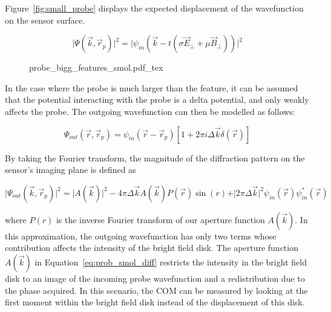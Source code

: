 Figure~\ref{fig:small_probe} displays the expected displacement of the wavefunction on the sensor surface.

\begin{equation}
    \vert \Psi(\vec{k},\vec{r}_p)\vert^2 = \vert \psi_{in}(\vec{k}-t(\sigma \vec{E}_{\perp}+\mu \vec{B}_{\perp}))\vert^2
    \label{eq:lin_shift}
\end{equation}


\begin{figure}[h]
	\centering
	\def\svgwidth{1\linewidth}
    {probe_bigg_features_smol.pdf_tex}
	\caption{}
	\label{fig:big_boii_probe}
\end{figure}
In the case where the probe is much larger than the feature, it can be assumed that the potential interacting with the probe is a delta potential, and only weakly affects the probe. The outgoing wavefunction can then be modelled as follows: 

\begin{equation}
    \Psi_{out}(\vec{r},\vec{r}_p)=\psi_{in}(\vec{r}-\vec{r}_p)\left[ 1+2\pi i \Delta \vec{k}\delta(\vec{r})\right]
    \label{eq:prob_smol_out}
\end{equation}

By taking the Fourier transform, the magnitude of the diffraction pattern on the sensor's imaging plane is defined as 

\begin{equation}
    \vert \Psi_{out}(\vec{k},\vec{r}_p)\vert^2 = \vert A(\vec{k})\vert^2-4\pi \Delta \vec{k} A(\vec{k})P(\vec{r})\sin(r) + \vert 2\pi\Delta \vec{k}\vert^2 \psi_{in}(\vec{r})\psi^*_{in}(\vec{r})
    \label{eq:prob_smol_diff}
\end{equation}

where $P(r)$ is the inverse Fourier transform of our aperture function $A(\vec{k})$.
%
In this approximation, the outgoing wavefunction has only two terms whose contribution affects the intensity of the bright field disk. The aperture function $A(\vec{k})$ in Equation~\ref{eq:prob_smol_diff} restricts the intensity in the bright field disk to an image of the incoming probe wavefunction and a redistribution due to the phase acquired. 
%
In this scenario, the COM can be measured by looking at the first moment within the bright field disk instead of the displacement of this disk. 

